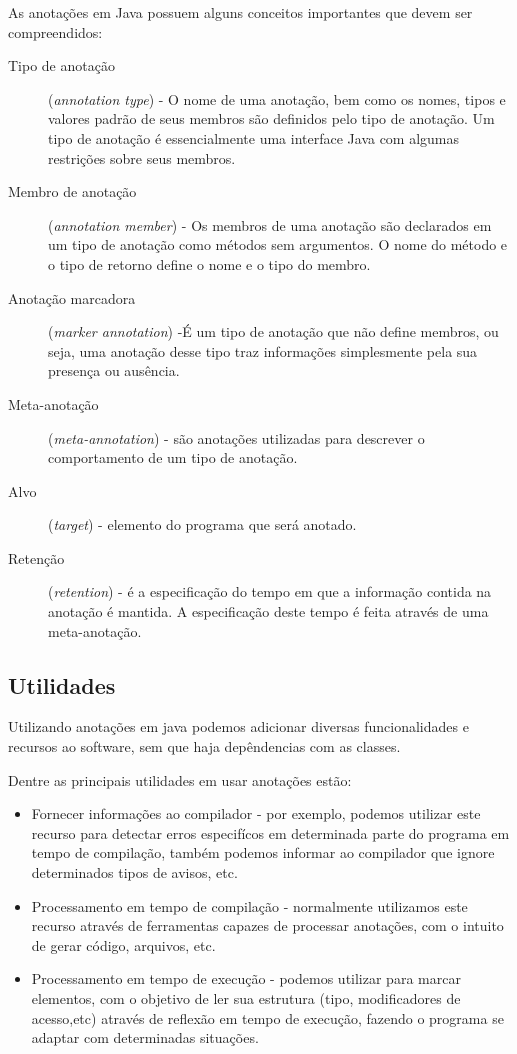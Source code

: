 \documentclass[tc,openright]{iiufrgs}
\begin{document}
As anotações em Java possuem alguns conceitos importantes que devem ser compreendidos: 

\begin{description}
\item [Tipo de anotação] (\textit{annotation type}) - O nome de uma anotação, bem como os nomes, tipos e valores padrão de seus membros são definidos pelo tipo de anotação. Um tipo de anotação é essencialmente uma interface Java com algumas restrições sobre seus membros.\cite{flanagan2005java}
\item [Membro de anotação] (\textit{annotation member}) - Os membros de uma anotação são declarados em um tipo de anotação como métodos sem argumentos. O nome do método e o tipo de retorno define o nome e o
tipo do membro. \cite{flanagan2005java}
\item [Anotação marcadora] (\textit{marker annotation}) -É um tipo de anotação que não define membros, ou seja, uma anotação desse tipo traz informações simplesmente pela sua presença ou ausência.\cite{flanagan2005java}
\item [Meta-anotação] (\textit{meta-annotation}) - são anotações utilizadas para descrever o comportamento de um tipo de anotação.\cite{horstmann2004core}
\item [Alvo] (\textit{target}) - elemento do programa que será anotado.
\item [Retenção] (\textit{retention}) - é a especificação do tempo em que a informação contida na anotação é mantida. A especificação deste tempo é feita através de uma meta-anotação. \cite{flanagan2005java}
\end{description}

\subsection{Utilidades}
Utilizando anotações em java podemos adicionar diversas funcionalidades e recursos ao software, sem que haja depêndencias com as classes.

 Dentre as principais utilidades em usar anotações estão:
\begin{itemize}
\item Fornecer informações ao compilador - por exemplo, podemos utilizar este recurso para detectar erros especifícos em determinada parte do programa em tempo de compilação, também podemos informar ao compilador que ignore determinados tipos de avisos, etc.
\item Processamento em tempo de compilação - normalmente utilizamos este recurso através de ferramentas capazes de processar anotações, com o intuito de gerar código, arquivos, etc. 
\item Processamento em tempo de execução - podemos utilizar para marcar elementos, com o objetivo de ler sua estrutura (tipo, modificadores de acesso,etc) através de reflexão em tempo de execução, fazendo o programa se adaptar com determinadas situações.
\end{itemize}
\end{document}
